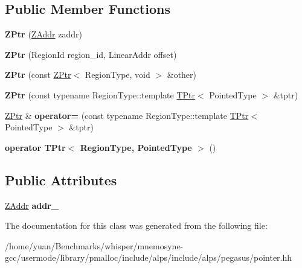 \subsection*{Public Member Functions}
\begin{DoxyCompactItemize}
\item 
{\bfseries Z\+Ptr} (\hyperlink{structalps_1_1ZAddr}{Z\+Addr} zaddr)\hypertarget{classalps_1_1BaseRelativePointer_1_1ZPtr_a3ecb59de4427a4d0281c61600dbf6b3d}{}\label{classalps_1_1BaseRelativePointer_1_1ZPtr_a3ecb59de4427a4d0281c61600dbf6b3d}

\item 
{\bfseries Z\+Ptr} (Region\+Id region\+\_\+id, Linear\+Addr offset)\hypertarget{classalps_1_1BaseRelativePointer_1_1ZPtr_a0128650f250004203b83603384ec84cd}{}\label{classalps_1_1BaseRelativePointer_1_1ZPtr_a0128650f250004203b83603384ec84cd}

\item 
{\bfseries Z\+Ptr} (const \hyperlink{classalps_1_1BaseRelativePointer_1_1ZPtr}{Z\+Ptr}$<$ Region\+Type, void $>$ \&other)\hypertarget{classalps_1_1BaseRelativePointer_1_1ZPtr_a1549b21bae1523032289aca8068a1443}{}\label{classalps_1_1BaseRelativePointer_1_1ZPtr_a1549b21bae1523032289aca8068a1443}

\item 
{\bfseries Z\+Ptr} (const typename Region\+Type\+::template \hyperlink{classalps_1_1BaseRelativePointer_1_1TPtr}{T\+Ptr}$<$ Pointed\+Type $>$ \&tptr)\hypertarget{classalps_1_1BaseRelativePointer_1_1ZPtr_a6fee847bab1b7ddaf29b3cecb298964a}{}\label{classalps_1_1BaseRelativePointer_1_1ZPtr_a6fee847bab1b7ddaf29b3cecb298964a}

\item 
\hyperlink{classalps_1_1BaseRelativePointer_1_1ZPtr}{Z\+Ptr} \& {\bfseries operator=} (const typename Region\+Type\+::template \hyperlink{classalps_1_1BaseRelativePointer_1_1TPtr}{T\+Ptr}$<$ Pointed\+Type $>$ \&tptr)\hypertarget{classalps_1_1BaseRelativePointer_1_1ZPtr_a911469805adc08046344d7215a9d8a71}{}\label{classalps_1_1BaseRelativePointer_1_1ZPtr_a911469805adc08046344d7215a9d8a71}

\item 
{\bfseries operator T\+Ptr$<$ Region\+Type, Pointed\+Type $>$} ()\hypertarget{classalps_1_1BaseRelativePointer_1_1ZPtr_a0148a9e9ddedc851890e46e437c5b5ba}{}\label{classalps_1_1BaseRelativePointer_1_1ZPtr_a0148a9e9ddedc851890e46e437c5b5ba}

\end{DoxyCompactItemize}
\subsection*{Public Attributes}
\begin{DoxyCompactItemize}
\item 
\hyperlink{structalps_1_1ZAddr}{Z\+Addr} {\bfseries addr\+\_\+}\hypertarget{classalps_1_1BaseRelativePointer_1_1ZPtr_a3adf23e694b99b04819f6d00abde040a}{}\label{classalps_1_1BaseRelativePointer_1_1ZPtr_a3adf23e694b99b04819f6d00abde040a}

\end{DoxyCompactItemize}


The documentation for this class was generated from the following file\+:\begin{DoxyCompactItemize}
\item 
/home/yuan/\+Benchmarks/whisper/mnemosyne-\/gcc/usermode/library/pmalloc/include/alps/include/alps/pegasus/pointer.\+hh\end{DoxyCompactItemize}
